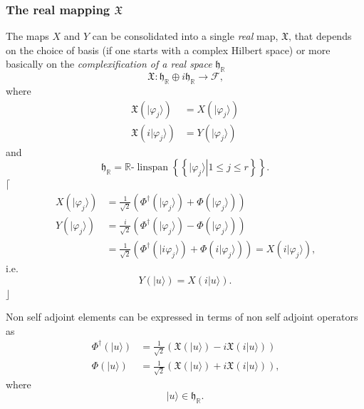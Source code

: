 \documentclass[aps, preprint]{revtex4}
\begin{document}
\subsubsection{The real mapping $\mathfrak{X}$}
The maps $X$ and $Y$ can be consolidated into a single \emph{real} map, $\mathfrak{X}\text{,}$ that depends on the choice of basis (if one starts with a complex Hilbert space) or more basically on the \emph{complexification
of a real space} $\mathfrak{h}_{\mathbb{R}}$
\begin{equation}\mathfrak{X} :\mathfrak{h}_{\mathbb{R}} \oplus i \mathfrak{h}_{\mathbb{R}} \rightarrow \mathcal{F}\text{,}
\end{equation}where
\begin{align}\mathfrak{X} \left (\vert \varphi _{j} \rangle \right ) &  =X \left (\vert \varphi _{j} \rangle \right ) \\
\mathfrak{X} \left (i\vert \varphi _{j} \rangle \right ) &  =Y \left (\vert \varphi _{j} \rangle \right )\end{align}and
\begin{equation}\mathfrak{h}_{\mathbb{R}} =\mathbb{R}\text{-}\ensuremath{\operatorname*{linspan}}\left \{\left \{\left .\vert \varphi _{j} \rangle \right \vert 1 \leq j \leq r\right \}\right \}\text{.}
\end{equation}$\lceil $
\begin{align}X \left (\vert \varphi _{j} \rangle \right ) &  =\frac{1}{\sqrt{2}} \left (\Phi ^{ \dag } \left (\vert \varphi _{j} \rangle \right ) +\Phi  \left (\vert \varphi _{j} \rangle \right )\right ) \\
Y \left (\vert \varphi _{j} \rangle \right ) &  =\frac{i}{\sqrt{2}} \left (\Phi ^{ \dag } \left (\vert \varphi _{j} \rangle \right ) -\Phi  \left (\vert \varphi _{j} \rangle \right )\right ) \\
 &  =\frac{1}{\sqrt{2}} \left (\Phi ^{ \dag } \left (\vert i \varphi _{j} \rangle \right ) +\Phi  \left (i\vert \varphi _{j} \rangle \right )\right ) =X \left (i\vert \varphi _{j} \rangle \right )\text{,}\end{align}i.e.
\begin{equation}Y \left (\vert u \rangle \right ) =X \left (i\vert u \rangle \right )\text{.}
\end{equation}$\rfloor $ 

Non self adjoint elements can be expressed in terms of non self adjoint operators as
\begin{align}\Phi ^{ \dag } \left (\vert u \rangle \right ) &  =\frac{1}{\sqrt{2}} \left (\mathfrak{X} \left (\vert u \rangle \right ) -i \mathfrak{X} \left (i\vert u \rangle \right )\right ) \\
\Phi  \left (\vert u \rangle \right ) &  =\frac{1}{\sqrt{2}} \left (\mathfrak{X} \left (\vert u \rangle \right ) +i \mathfrak{X} \left (i\vert u \rangle \right )\right )\text{,}\end{align}where
\begin{equation}\vert u \rangle  \in \mathfrak{h}_{\mathbb{R}}\text{.}
\end{equation}
\end{document}

